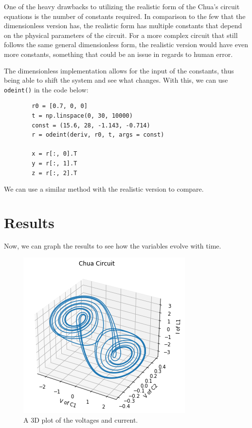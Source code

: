 \documentclass{article}
\begin{document}
    One of the heavy drawbacks to utilizing the realistic form of the Chua's circuit equations is the number of constants required. In comparison to the few that the dimensionless version has, the realistic form has multiple constants that depend on the physical parameters of the circuit. For a more complex circuit that still follows the same general dimensionless form, the realistic version would have even more constants, something that could be an issue in regards to human error. 
    
    
    The dimensionless implementation allows for the input of the constants, thus being able to shift the system and see what changes. With this, we can use \verb|odeint()| in the code below:
    \begin{lstlisting}
        r0 = [0.7, 0, 0]
        t = np.linspace(0, 30, 10000)
        const = (15.6, 28, -1.143, -0.714)
        r = odeint(deriv, r0, t, args = const)
        
        x = r[:, 0].T
        y = r[:, 1].T
        z = r[:, 2].T
    \end{lstlisting}
    
    We can use a similar method with the realistic version to compare. 
    
    \medskip
    \newpage
\section{Results}

    Now, we can graph the results to see how the variables evolve with time. 
    
    \begin{figure}[h!]
        \centering
        \includegraphics[scale=0.6]{Images/initial.png}
        \caption{A 3D plot of the voltages and current.}
        \label{fig:my_label}
    \end{figure}
\end{document}
